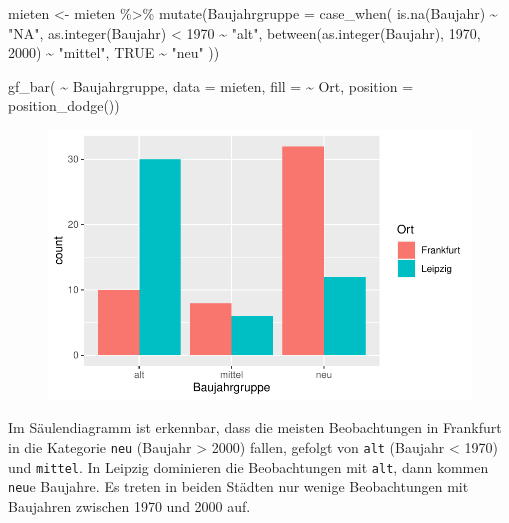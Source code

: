 \documentclass[
  a4paper,
  DIV=11]{scrartcl}
\newenvironment{Shaded}{\begin{snugshade}}{\end{snugshade}}
\newcommand{\AttributeTok}[1]{\textcolor[rgb]{0.40,0.45,0.13}{#1}}
\newcommand{\ConstantTok}[1]{\textcolor[rgb]{0.56,0.35,0.01}{#1}}
\newcommand{\DecValTok}[1]{\textcolor[rgb]{0.68,0.00,0.00}{#1}}
\newcommand{\FunctionTok}[1]{\textcolor[rgb]{0.28,0.35,0.67}{#1}}
\newcommand{\NormalTok}[1]{\textcolor[rgb]{0.00,0.23,0.31}{#1}}
\newcommand{\OtherTok}[1]{\textcolor[rgb]{0.00,0.23,0.31}{#1}}
\newcommand{\SpecialCharTok}[1]{\textcolor[rgb]{0.37,0.37,0.37}{#1}}
\newcommand{\StringTok}[1]{\textcolor[rgb]{0.13,0.47,0.30}{#1}}
\begin{document}
\begin{Shaded}
\begin{Highlighting}[]
\NormalTok{mieten }\OtherTok{\textless{}{-}}\NormalTok{ mieten }\SpecialCharTok{\%\textgreater{}\%}
  \FunctionTok{mutate}\NormalTok{(}\AttributeTok{Baujahrgruppe =} \FunctionTok{case\_when}\NormalTok{(}
    \FunctionTok{is.na}\NormalTok{(Baujahr) }\SpecialCharTok{\textasciitilde{}} \StringTok{"NA"}\NormalTok{,}
    \FunctionTok{as.integer}\NormalTok{(Baujahr) }\SpecialCharTok{\textless{}} \DecValTok{1970} \SpecialCharTok{\textasciitilde{}} \StringTok{"alt"}\NormalTok{,}
    \FunctionTok{between}\NormalTok{(}\FunctionTok{as.integer}\NormalTok{(Baujahr), }\DecValTok{1970}\NormalTok{, }\DecValTok{2000}\NormalTok{) }\SpecialCharTok{\textasciitilde{}} \StringTok{"mittel"}\NormalTok{,}
    \ConstantTok{TRUE} \SpecialCharTok{\textasciitilde{}} \StringTok{"neu"}
\NormalTok{  ))}

\FunctionTok{gf\_bar}\NormalTok{( }\SpecialCharTok{\textasciitilde{}}\NormalTok{ Baujahrgruppe, }\AttributeTok{data =}\NormalTok{ mieten, }\AttributeTok{fill =} \SpecialCharTok{\textasciitilde{}}\NormalTok{ Ort, }\AttributeTok{position =} \FunctionTok{position\_dodge}\NormalTok{())}
\end{Highlighting}
\end{Shaded}

\begin{figure}[H]

{\centering \includegraphics{Mietmodellierung_files/figure-pdf/unnamed-chunk-15-1.pdf}

}

\end{figure}

Im Säulendiagramm ist erkennbar, dass die meisten Beobachtungen in
Frankfurt in die Kategorie \texttt{neu} (Baujahr \textgreater{} 2000)
fallen, gefolgt von \texttt{alt} (Baujahr \textless{} 1970) und
\texttt{mittel}. In Leipzig dominieren die Beobachtungen mit
\texttt{alt}, dann kommen \texttt{neu}e Baujahre. Es treten in beiden
Städten nur wenige Beobachtungen mit Baujahren zwischen 1970 und 2000
auf.
\end{document}
